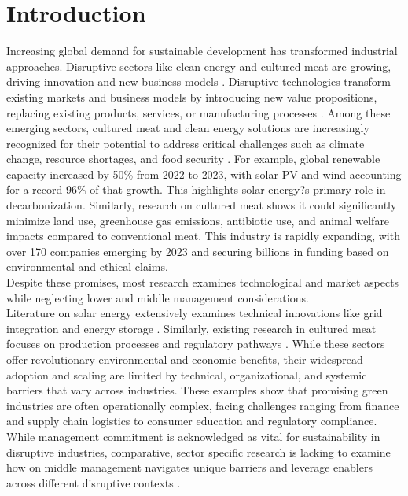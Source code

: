 
\section{Introduction}

Increasing global demand for sustainable development has transformed industrial approaches. Disruptive sectors like clean energy and cultured meat are growing, driving innovation and new business models \textcite{SeedBlink2025, Deloitte2025}. Disruptive technologies transform existing markets and business models by introducing new value propositions, replacing existing products, services, or manufacturing processes \textcite{Bower1995}. Among these emerging sectors, cultured meat and clean energy solutions are increasingly recognized for their potential to address critical challenges such as climate change, resource shortages, and food security \textcite{Wageningen2022, GFI2025future}. For example, global renewable capacity increased by 50\% from 2022 to 2023, with solar PV and wind accounting for a record 96\% of that growth. This highlights solar energy?s primary role in decarbonization. Similarly, research on cultured meat shows it could significantly minimize land use, greenhouse gas emissions, antibiotic use, and animal welfare impacts compared to conventional meat. This industry is rapidly expanding, with over 170 companies emerging by 2023 and securing billions in funding based on environmental and ethical claims. \\

Despite these promises, most research examines technological and market aspects while neglecting lower and middle management considerations. \\

Literature on solar energy extensively examines technical innovations like grid integration and energy storage \textcite{SINSEL20202271}. Similarly, existing research in cultured meat focuses on production processes and regulatory pathways \textcite{Bryant2020}. While these sectors offer revolutionary environmental and economic benefits, their widespread adoption and scaling are limited by technical, organizational, and systemic barriers that vary across industries. These examples show that promising green industries are often operationally complex, facing challenges ranging from finance and supply chain logistics to consumer education and regulatory compliance. \\

While management commitment is acknowledged as vital for sustainability in disruptive industries, comparative, sector specific research is lacking to examine how on middle management navigates unique barriers and leverage enablers across different disruptive contexts \textcite{Lozano2015, Egri2000}. \\

